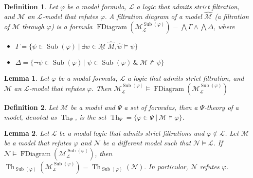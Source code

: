 \documentclass[a4paper]{article}
\theoremstyle{defin}
\newtheorem{defin}{Definition}
\theoremstyle{theorem}
\theoremstyle{prop}
\theoremstyle{lemma}
\newtheorem{lemma}{Lemma}
\theoremstyle{ex}
\theoremstyle{col}
\begin{document}
\begin{defin} Let $\varphi$ be a modal formula, $\mathcal{L}$ a logic that admits strict filtration, and $\mathcal{M}$ an $\mathcal{L}$-model that refutes $\varphi$. A \emph{filtration diagram} of a model $\widehat{\mathcal{M}}$ (a filtration of $\mathcal{M}$ through $\varphi$) is a formula $\operatorname{FDiagram}(\mathcal{M}_{\mathcal{L}}^{\operatorname{Sub}(\varphi)}) = \bigwedge \Gamma \wedge \bigwedge \Delta$, where
  \begin{itemize}
    \item $\Gamma =
    \{ \psi \in \operatorname{Sub}(\varphi) \: | \: \exists w \in \underline{\mathcal{M}} \: \widehat{M}, \hat{w} \models \psi \}$
    \item $\Delta = \{ \neg \psi \in \operatorname{Sub}(\varphi) \: | \: \psi \in \operatorname{Sub}(\varphi) \: \& \: \mathcal{M} \not\models \psi \}$
  \end{itemize}
\end{defin}

\begin{lemma}
  Let $\varphi$ be a modal formula, $\mathcal{L}$ a logic that admits strict filtration, and $\mathcal{M}$ an $\mathcal{L}$-model that refutes $\varphi$. Then $\mathcal{M}_{\mathcal{L}}^{\operatorname{Sub}(\varphi)} \models \operatorname{FDiagram}(\mathcal{M}_{\mathcal{L}}^{\operatorname{Sub}(\varphi)})$
\end{lemma}

\begin{defin}
  Let $\mathcal{M}$ be a model and $\Psi$ a set of formulas, then a $\Psi$-theory of a model, denoted as $\operatorname{Th}_{\Psi}$, is the set $\operatorname{Th}_{\Psi} = \{ \varphi \in \Psi \: | \: \mathcal{M} \models \varphi \}$.
\end{defin}

\begin{lemma}
  Let $\mathcal{L}$ be a modal logic that admits strict filtrations and $\varphi \not\in \mathcal{L}$.
  Let $\mathcal{M}$ be a model that refutes $\varphi$ and $\mathcal{N}$ be a different model such that $\mathcal{N} \models \mathcal{L}$. If $\mathcal{N} \models \operatorname{FDiagram}(\mathcal{M}_{\mathcal{L}}^{\operatorname{Sub}(\varphi)})$, then $\operatorname{Th}_{\operatorname{Sub}(\varphi)}(\mathcal{M}_{\mathcal{L}}^{\operatorname{Sub}(\varphi)}) = \operatorname{Th}_{\operatorname{Sub}(\varphi)}(\mathcal{N})$. In particular, $\mathcal{N}$ refutes $\varphi$.
\end{lemma}
\end{document}
